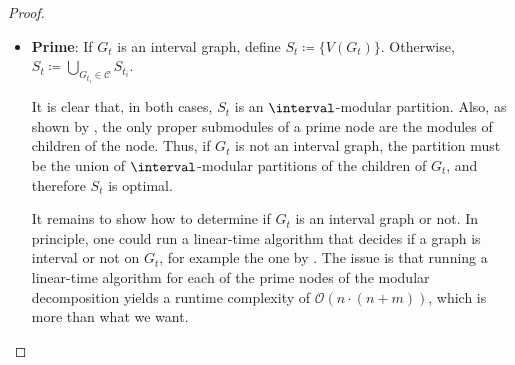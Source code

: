 \documentclass[11pt]{article}
\theoremstyle{plain}
\theoremstyle{definition}
\theoremstyle{remark}
\renewcommand{\O}{\mathcal{O}}
\DeclarePairedDelimiter\abs{\lvert}{\rvert}
\begin{document}
\begin{proof}
\begin{itemize}
        If $C_1$ is empty, we just define $S_t \coloneqq \Stail$.

        By \cref{prop:thinness-join}, class $C_1$ induces an interval graph. Every class in $\Stail$ also induces an interval graph, as they belong to $\interval$-modular partitions of the children of $G_t$. On the other hand, notice that all classes induce modules of $G_t$. Thus, $S_t$ is an $\interval$-modular partition.

        Take another $\interval$-modular partition $S'_t$ of $G_t$. We will see that $\abs{S'_t} \geq \abs{S_t}$.
        
        As said earlier, the modules of $G_t$ are unions of children of $G_t$, or submodules of children of $G_t$. For a module that is a join of two graphs to be an interval graph, it must be the join of a complete graph and an interval graph by \cref{prop:thinness-join}. Thus, if two or more children of $G_t$ are joined in a class of $S'_t$, at most one of them is not a complete graph, and it must also be an interval graph. If there is more than one class in $S'_t$ that induces a join of graphs, we can change the classes of all vertices belonging to children that induce complete graphs to just one of those classes, and have an $\interval$-modular partition with no more classes than $S'_t$.

        Furthermore, $S'_t$ is forced to contain $\interval$-modular partitions of the children of $G_t$ that do not induce interval graphs. Therefore, $S_t$ contains no more classes than $S'_t$.

        Finally, the graph $G_t$ is complete if and only if all of its children are complete, and is an interval graph if and only if $C_1$ contains all vertices of $G_t$.

        \item \textbf{Prime}: If $G_t$ is an interval graph, define $S_t \coloneqq \{V(G_t)\}$. Otherwise, $S_t \coloneqq \bigcup_{G_{t_i} \in \mathcal{C}}S_{t_i}$.

        It is clear that, in both cases, $S_t$ is an $\interval$-modular partition. Also, as shown by \citet{modular-decomposition}, the only proper submodules of a prime node are the modules of children of the node. Thus, if $G_t$ is not an interval graph, the partition must be the union of $\interval$-modular partitions of the children of $G_t$, and therefore $S_t$ is optimal.

        It remains to show how to determine if $G_t$ is an interval graph or not. In principle, one could run a linear-time algorithm that decides if a graph is interval or not on $G_t$, for example the one by \citet{B-L-interval}. The issue is that running a linear-time algorithm for each of the prime nodes of the modular decomposition yields a runtime complexity of $\O(n\cdot(n+m))$, which is more than what we want.


\end{itemize}
\end{proof}
\end{document}

